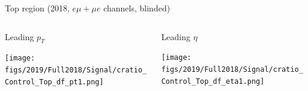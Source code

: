 \documentclass[9pt]{beamer}
\begin{document}
\begin{frame}{Top region (2018, $e \mu + \mu e$ channels, blinded)}
\justifying
\begin{columns}
		\hspace{5pt}
		\begin{column}{0.32\textwidth}
			\begin{center}
				\begin{block}{\centering Leading $p_T$}\end{block}	
     			\texttt{[image: figs/2019/Full2018/Signal/cratio\_Control\_Top\_df\_pt1.png]}
    		\end{center}		
		\end{column} \hfill
		\begin{column}{0.32\textwidth}
			\begin{center}
				\begin{block}{\centering Leading $\eta$}\end{block}	
     			\texttt{[image: figs/2019/Full2018/Signal/cratio\_Control\_Top\_df\_eta1.png]}
    		\end{center}		
		\end{column} \hfill
	\end{columns} \vspace{-5pt}
	\begin{columns}
		\hspace{5pt}

\end{columns}
\end{frame}
\end{document}
